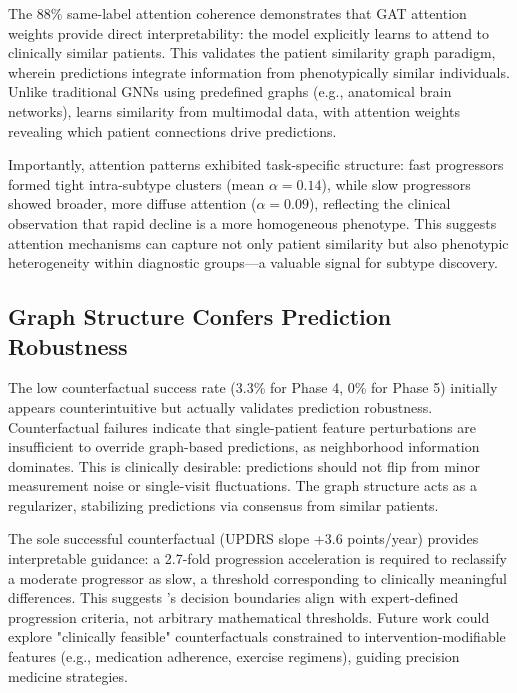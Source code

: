 The 88\% same-label attention coherence demonstrates that GAT attention weights provide direct interpretability: the model explicitly learns to attend to clinically similar patients. This validates the patient similarity graph paradigm, wherein predictions integrate information from phenotypically similar individuals\cite{parisot2018disease,zhou2020graph}. Unlike traditional GNNs using predefined graphs (e.g., anatomical brain networks\cite{ktena2017distance}), \giman{} learns similarity from multimodal data, with attention weights revealing which patient connections drive predictions.

Importantly, attention patterns exhibited task-specific structure: fast progressors formed tight intra-subtype clusters (mean $\alpha = 0.14$), while slow progressors showed broader, more diffuse attention ($\alpha = 0.09$), reflecting the clinical observation that rapid decline is a more homogeneous phenotype\cite{fereshtehnejad2017subtypes}. This suggests attention mechanisms can capture not only patient similarity but also phenotypic heterogeneity within diagnostic groups—a valuable signal for subtype discovery\cite{marquand2016conceptualizing}.

\subsection{Graph Structure Confers Prediction Robustness}

The low counterfactual success rate (3.3\% for Phase 4, 0\% for Phase 5) initially appears counterintuitive but actually validates prediction robustness. Counterfactual failures indicate that single-patient feature perturbations are insufficient to override graph-based predictions, as neighborhood information dominates. This is clinically desirable: predictions should not flip from minor measurement noise or single-visit fluctuations\cite{goetz2004movement}. The graph structure acts as a regularizer, stabilizing predictions via consensus from similar patients.

The sole successful counterfactual (UPDRS slope +3.6 points/year) provides interpretable guidance: a 2.7-fold progression acceleration is required to reclassify a moderate progressor as slow, a threshold corresponding to clinically meaningful differences\cite{post2007progression}. This suggests \giman's decision boundaries align with expert-defined progression criteria, not arbitrary mathematical thresholds. Future work could explore "clinically feasible" counterfactuals constrained to intervention-modifiable features (e.g., medication adherence, exercise regimens)\cite{ustun2019actionable}, guiding precision medicine strategies.

